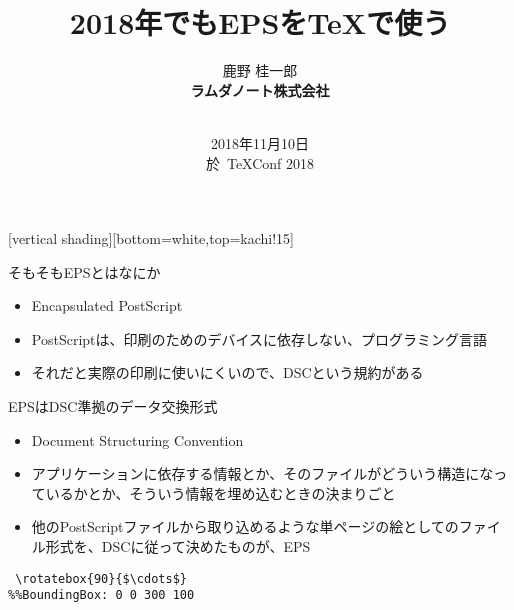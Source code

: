 \documentclass[14pt,dvipdfmx,uplatex]{beamer}
\title{2018年でもEPSを\TeX{}で使う}
\author{\sffamily 鹿野 桂一郎\\
\bfseries ラムダノート株式会社\\
\small\bfseries \email{k16.shikano@lambdanote.com} \\ 
\twitter{golden\_lucky} 
}
\date{\sffamily\footnotesize 2018年11月10日\\ 於\, TeXConf 2018}
\begin{document}
\selectfont

\frame{\titlepage}

[vertical shading][bottom=white,top=kachi!15]

\begin{frame}[plain]
  \begin{center}
    \color{kachi}\yasagoth
  \end{center}
\end{frame}

\begin{frame}[plain]
  \begin{center}
    \color{kachi}\yasagoth
  \end{center}
\end{frame}

\begin{frame}[t]{\inhibitglue そもそもEPSとはなにか}
  \sffamily
  \begin{itemize}
    \item Encapsulated {\color{red}PostScript}
    \item PostScriptは、印刷のためのデバイスに依存しない、プログラミング言語
    \item それだと実際の印刷に使いにくいので、{\color{red}DSC}という規約がある
  \end{itemize}
\end{frame}

\begin{frame}[t,fragile=singleslide]{\inhibitglue EPSはDSC準拠のデータ交換形式}
  \sffamily
  \begin{itemize}
    \item Document Structuring Convention
    \item アプリケーションに依存する情報とか、そのファイルがどういう構造になっているかとか、そういう情報を埋め込むときの決まりごと
    \item 他のPostScriptファイルから取り込めるような単ページの絵としてのファイル形式を、DSCに従って決めたものが、{\color{red}EPS}
  \end{itemize}
  \fontsize{7pt}{7pt}\selectfont
  \begin{tcolorbox}
  \begin{Verbatim}[commandchars=\\\{\},mathescape]
%!PS-Adobe-3.1 EPSF-3.0
 \rotatebox{90}{$\cdots$}
%%BoundingBox: 0 0 300 100
  \end{Verbatim}
  \end{tcolorbox}
\end{frame}
\end{document}
